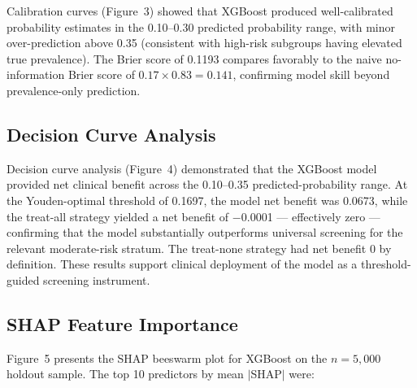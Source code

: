 \documentclass[12pt,a4paper]{article}
\begin{document}
Calibration curves (Figure~3) showed that XGBoost
produced well-calibrated probability estimates in the 0.10--0.30 predicted
probability range, with minor over-prediction above 0.35 (consistent with
high-risk subgroups having elevated true prevalence). The Brier score of 0.1193
compares favorably to the naive no-information Brier score of
$0.17 \times 0.83 = 0.141$, confirming model skill beyond prevalence-only
prediction.

\subsection{Decision Curve Analysis}

Decision curve analysis (Figure~4) demonstrated that the XGBoost model
provided net clinical benefit across the 0.10--0.35 predicted-probability
range. At the Youden-optimal threshold of 0.1697, the model net benefit was
0.0673, while the treat-all strategy yielded a net benefit of $-$0.0001 ---
effectively zero --- confirming that the model substantially outperforms
universal screening for the relevant moderate-risk stratum. The treat-none
strategy had net benefit 0 by definition. These results support clinical
deployment of the model as a threshold-guided screening instrument.

\subsection{SHAP Feature Importance}

Figure~5 presents the SHAP beeswarm plot for XGBoost on
the $n = 5{,}000$ holdout sample. The top 10 predictors by mean $|$SHAP$|$ were:
\end{document}

